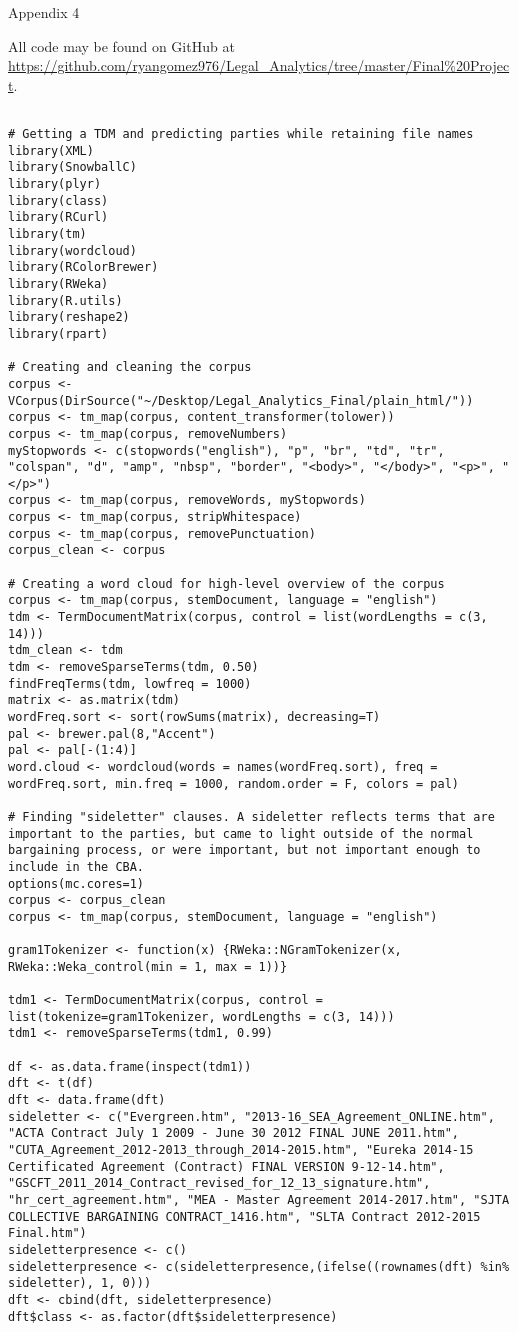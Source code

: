 \begin{center}
Appendix 4
\end{center}

\noindent All code may be found on GitHub at \url{https://github.com/ryangomez976/Legal_Analytics/tree/master/Final%20Project}.\\
[1mm]

\begin{lstlisting}

# Getting a TDM and predicting parties while retaining file names
library(XML)
library(SnowballC)
library(plyr)
library(class)
library(RCurl)
library(tm)
library(wordcloud)
library(RColorBrewer)
library(RWeka)
library(R.utils)
library(reshape2)
library(rpart)

# Creating and cleaning the corpus
corpus <- VCorpus(DirSource("~/Desktop/Legal_Analytics_Final/plain_html/"))
corpus <- tm_map(corpus, content_transformer(tolower))
corpus <- tm_map(corpus, removeNumbers)
myStopwords <- c(stopwords("english"), "p", "br", "td", "tr", "colspan", "d", "amp", "nbsp", "border", "<body>", "</body>", "<p>", "</p>")
corpus <- tm_map(corpus, removeWords, myStopwords)
corpus <- tm_map(corpus, stripWhitespace)
corpus <- tm_map(corpus, removePunctuation)
corpus_clean <- corpus

# Creating a word cloud for high-level overview of the corpus
corpus <- tm_map(corpus, stemDocument, language = "english")
tdm <- TermDocumentMatrix(corpus, control = list(wordLengths = c(3, 14)))
tdm_clean <- tdm
tdm <- removeSparseTerms(tdm, 0.50)
findFreqTerms(tdm, lowfreq = 1000)
matrix <- as.matrix(tdm)
wordFreq.sort <- sort(rowSums(matrix), decreasing=T)
pal <- brewer.pal(8,"Accent")
pal <- pal[-(1:4)]
word.cloud <- wordcloud(words = names(wordFreq.sort), freq = wordFreq.sort, min.freq = 1000, random.order = F, colors = pal)

# Finding "sideletter" clauses. A sideletter reflects terms that are important to the parties, but came to light outside of the normal bargaining process, or were important, but not important enough to include in the CBA.
options(mc.cores=1)
corpus <- corpus_clean
corpus <- tm_map(corpus, stemDocument, language = "english")

gram1Tokenizer <- function(x) {RWeka::NGramTokenizer(x, RWeka::Weka_control(min = 1, max = 1))}

tdm1 <- TermDocumentMatrix(corpus, control = list(tokenize=gram1Tokenizer, wordLengths = c(3, 14)))
tdm1 <- removeSparseTerms(tdm1, 0.99)

df <- as.data.frame(inspect(tdm1))
dft <- t(df)
dft <- data.frame(dft)
sideletter <- c("Evergreen.htm", "2013-16_SEA_Agreement_ONLINE.htm", "ACTA Contract July 1 2009 - June 30 2012 FINAL JUNE 2011.htm", "CUTA_Agreement_2012-2013_through_2014-2015.htm", "Eureka 2014-15 Certificated Agreement (Contract) FINAL VERSION 9-12-14.htm", "GSCFT_2011_2014_Contract_revised_for_12_13_signature.htm", "hr_cert_agreement.htm", "MEA - Master Agreement 2014-2017.htm", "SJTA COLLECTIVE BARGAINING CONTRACT_1416.htm", "SLTA Contract 2012-2015 Final.htm")
sideletterpresence <- c()
sideletterpresence <- c(sideletterpresence,(ifelse((rownames(dft) %in% sideletter), 1, 0)))
dft <- cbind(dft, sideletterpresence)
dft$class <- as.factor(dft$sideletterpresence)


\end{lstlisting}
